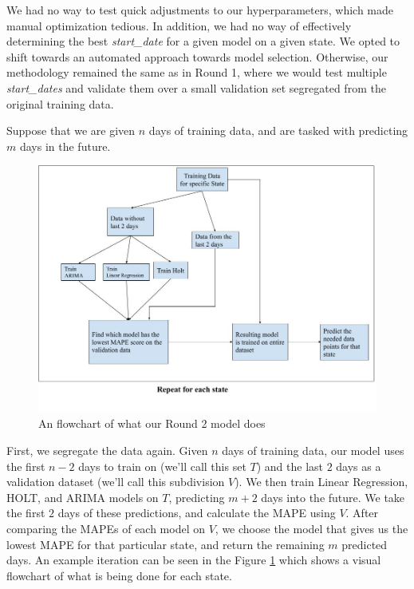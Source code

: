 \documentclass[sigconf,nonacm]{acmart}
\begin{document}
We had no way to test quick adjustments to our hyperparameters, which made
manual optimization tedious. In addition, we had no way of effectively
determining the best \emph{start\_date} for a given model on a given state. 
We opted to shift towards an automated approach towards model selection. 
Otherwise, our methodology remained the same as in Round 1, where we would test
multiple \emph{start\_dates} and validate them over a small validation set segregated
from the original training data.

Suppose that we are given $n$ days of training data, and are tasked with
predicting $m$ days in the future. 

\begin{figure}
  \centering
  \includegraphics[width=\linewidth]{figures/Final_model.jpg}
  \caption{An flowchart of what our Round 2 model does}
  \label{fig:model_final}
\end{figure}

First, we segregate the data again. Given $n$ days of training data, our model
uses the first $n-2$ days to train on (we'll call this set $T$) and the last
$2$ days as a validation dataset (we'll call this subdivision $V$). We then
train Linear Regression, HOLT, and ARIMA models on $T$, predicting $m+2$ days
into the future. We take the first $2$ days of these predictions, and calculate
the MAPE using $V$. After comparing the MAPEs of each model on $V$, we choose
the model that gives us the lowest MAPE for that particular state, and return
the remaining $m$ predicted days. An example iteration can be seen in the 
Figure \ref{fig:model_final} which shows a visual flowchart of what is being done
for each state.
\end{document}
